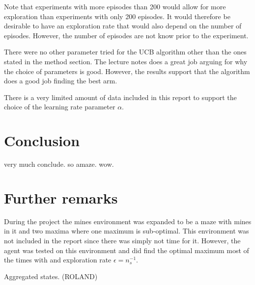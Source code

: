 \documentclass[11pt]{article}
\numberwithin{equation}{section}
\begin{document}
\begin{flushleft}
Note that experiments with more episodes than 200 would allow for more exploration than experiments with only 200 episodes. It would therefore be desirable to have an exploration rate that would also depend on the number of episodes. However, the number of episodes are not know prior to the experiment. \newline

There were no other parameter tried for the UCB algorithm other than the ones stated in the method section. The lecture notes does a great job arguing for why the choice of parameters is good. However, the results support that the algorithm does a good job finding the best arm. \newline

There is a very limited amount of data included in this report to support the choice of the learning rate parameter $\alpha$.

\section{Conclusion}

very much conclude. so amaze. wow.

\section{Further remarks}

During the project the mines environment was expanded to be a maze with mines in it and two maxima where one maximum is sub-optimal. This environment was not included in the report since there was simply not time for it. However, the agent was tested on this environment and did find the optimal maximum most of the times with and exploration rate $\epsilon = n_s^{-1}$.

Aggregated states. (ROLAND)

\end{flushleft}
\end{document}
